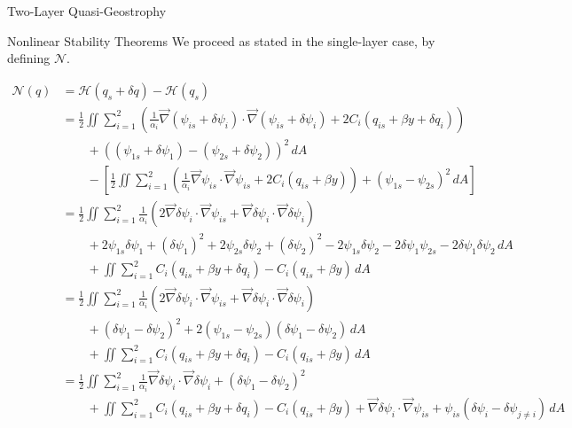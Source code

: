 \documentclass[12pt]{article}
\begin{document}
\begin{section}{Two-Layer Quasi-Geostrophy}
    \begin{subsection}{Nonlinear Stability Theorems}
        We proceed as stated in the single-layer case, by defining $\mathcal{N}$.

        \begin{align*}
            \mathcal{N}(q)
            & = \mathcal{H}(q_s + \delta q) - \mathcal{H}(q_s) \\
            &= \frac12 \iint \sum_{i=1}^2 \left( \frac{1}{\alpha_i}\vec\nabla (\psi_{is} + \delta\psi_i) \cdot \vec\nabla (\psi_{is} + \delta\psi_i) + 2C_i(q_{is} + \beta y + \delta q_i) \right) \\
            &\quad\quad + ((\psi_{1s} + \delta\psi_1) - (\psi_{2s} + \delta\psi_2))^2 \, dA \\
            &\quad\quad - \left[ \frac12 \iint \sum_{i=1}^2 \left( \frac{1}{\alpha_i}\vec\nabla \psi_{is} \cdot \vec\nabla \psi_{is} + 2C_i(q_{is} + \beta y) \right) + (\psi_{1s} - \psi_{2s})^2 \, dA \right] \\
            &= \frac12 \iint \sum_{i=1}^2 \frac{1}{\alpha_i} (2 \vec\nabla\delta\psi_i \cdot \vec\nabla\psi_{is} + \vec\nabla\delta\psi_i \cdot \vec\nabla\delta\psi_i) \\
            &\quad\quad + 2\psi_{1s}\delta\psi_1 + (\delta\psi_1)^2 + 2\psi_{2s}\delta\psi_2 + (\delta\psi_2)^2 - 2\psi_{1s}\delta\psi_2 - 2\delta\psi_1\psi_{2s} - 2\delta\psi_1\delta\psi_2 \, dA \\
            &\quad\quad + \iint \sum_{i=1}^2 C_i(q_{is} + \beta y + \delta q_i) - C_i(q_{is} + \beta y) \, dA \\
            &= \frac12 \iint \sum_{i=1}^2 \frac{1}{\alpha_i} (2 \vec\nabla\delta\psi_i \cdot \vec\nabla\psi_{is} + \vec\nabla\delta\psi_i \cdot \vec\nabla\delta\psi_i) \\
            &\quad\quad + (\delta\psi_1 - \delta\psi_2)^2 + 2(\psi_{1s} - \psi_{2s})(\delta\psi_1 - \delta\psi_2) \, dA \\
            &\quad\quad + \iint \sum_{i=1}^2 C_i(q_{is} + \beta y + \delta q_i) - C_i(q_{is} + \beta y) \, dA \\
            &= \frac12 \iint \sum_{i=1}^2 \frac{1}{\alpha_i} \vec\nabla\delta\psi_i \cdot \vec\nabla\delta\psi_i + (\delta\psi_1 - \delta\psi_2)^2 \\
            &\quad\quad + \iint \sum_{i=1}^2 C_i(q_{is} + \beta y + \delta q_i) - C_i(q_{is} + \beta y) + \vec\nabla\delta\psi_i \cdot \vec\nabla\psi_{is} + \psi_{is}(\delta\psi_i - \delta\psi_{j \ne i}) \, dA \\

\end{align*}
\end{subsection}
\end{section}
\end{document}
